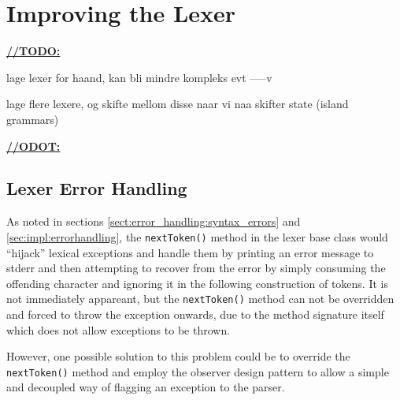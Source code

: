 \section{Improving the Lexer}

\underline{\textbf{\LARGE //TODO:}}

lage lexer for haand, kan bli mindre kompleks evt -----v

lage flere lexere, og skifte mellom disse naar vi naa skifter state (island grammars)

\underline{\textbf{\LARGE //ODOT:}}

\subsection{Lexer Error Handling}
\label{sect:future_work:lexer_error_handling}
As noted in sections \ref{sect:error_handling:syntax_errors} and
\ref{sec:impl:errorhandling}, the \verb!nextToken()! method in the lexer base class
would ``hijack'' lexical exceptions and handle them by printing an error message
to stderr and then attempting to recover from the error by simply consuming the
offending character and ignoring it in the following construction of tokens. It is 
not immediately appareant, but the \verb!nextToken()! method can not be overridden and
forced to throw the exception onwards, due to the method signature itself which
does not allow exceptions to be thrown. 

However, one possible solution to this problem could be to override the \verb!nextToken()! method and employ the observer design pattern to allow a simple and decoupled way of flagging an exception to the parser.
